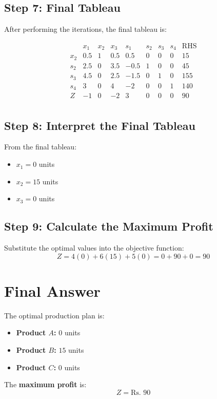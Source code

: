 \documentclass{article}
\begin{document}
\subsection*{Step 7: Final Tableau}
After performing the iterations, the final tableau is:

\[
\begin{array}{cccccccc|c}
 & x_1 & x_2 & x_3 & s_1 & s_2 & s_3 & s_4 & \text{RHS} \\
\hline
x_2 & 0.5 & 1 & 0.5 & 0.5 & 0 & 0 & 0 & 15 \\
s_2 & 2.5 & 0 & 3.5 & -0.5 & 1 & 0 & 0 & 45 \\
s_3 & 4.5 & 0 & 2.5 & -1.5 & 0 & 1 & 0 & 155 \\
s_4 & 3 & 0 & 4 & -2 & 0 & 0 & 1 & 140 \\
\hline
Z & -1 & 0 & -2 & 3 & 0 & 0 & 0 & 90 \\
\end{array}
\]

\subsection*{Step 8: Interpret the Final Tableau}
From the final tableau:
\begin{itemize}
    \item \( x_1 = 0 \) units
    \item \( x_2 = 15 \) units
    \item \( x_3 = 0 \) units
\end{itemize}

\subsection*{Step 9: Calculate the Maximum Profit}
Substitute the optimal values into the objective function:
\[
Z = 4(0) + 6(15) + 5(0) = 0 + 90 + 0 = 90
\]

\section*{Final Answer}
The optimal production plan is:
\begin{itemize}
    \item \textbf{Product \( A \):} \( 0 \) units
    \item \textbf{Product \( B \):} \( 15 \) units
    \item \textbf{Product \( C \):} \( 0 \) units
\end{itemize}

The \textbf{maximum profit} is:
\[
Z = \text{Rs. } 90
\]
\end{document}
